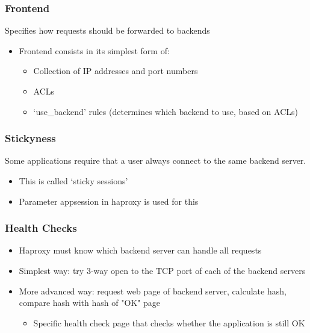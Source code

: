 \documentclass{article}
\begin{document}
\subsubsection{Frontend}

Specifies how requests should be forwarded to backends

\begin{itemize}
    \item Frontend consists in its simplest form of:
    \begin{itemize}
        \item Collection of IP addresses and port numbers
        \item ACLs
        \item `use\_backend' rules (determines which backend to use, based on ACLs)
    \end{itemize}
\end{itemize}

\subsubsection{Stickyness}

Some applications require that a user always connect to the same backend server.

\begin{itemize}
    \item This is called `sticky sessions'
    \item Parameter appsession in haproxy is used for this
\end{itemize}

\subsubsection{Health Checks}

\begin{itemize}
    \item Haproxy must know which backend server can handle all requests
    \item Simplest way: try 3-way open to the TCP port of each of the backend servers
    \item More advanced way: request web page of backend server, calculate hash, compare hash with hash of "OK" page
    \begin{itemize}
        \item Specific health check page that checks whether the application is still OK
    \end{itemize}
\end{itemize}
\end{document}
